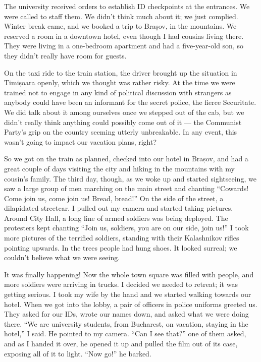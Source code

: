 \documentclass[12pt]{book}
\begin{document}
The university received orders to establish ID checkpoints at the
entrances. We were called to staff them. We didn't think much about it;
we just complied. Winter break came, and we booked a trip to Brașov, in
the mountains. We reserved a room in a downtown hotel, even though I had
cousins living there. They were living in a one-bedroom apartment and
had a five-year-old son, so they didn't really have room for guests.

On the taxi ride to the train station, the driver brought up the
situation in Timișoara openly, which we thought was rather risky. At the
time we were trained not to engage in any kind of political discussion
with strangers as anybody could have been an informant for the secret
police, the fierce Securitate. We did talk about it among ourselves once
we stepped out of the cab, but we didn't really think anything could
possibly come out of it --- the Communist Party's grip on the country
seeming utterly unbreakable. In any event, this wasn't going to impact
our vacation plans, right?

So we got on the train as planned, checked into our hotel in Brașov, and
had a great couple of days visiting the city and hiking in the mountains
with my cousin's family. The third day, though, as we woke up and
started sightseeing, we saw a large group of men marching on the main
street and chanting ``Cowards! Come join us, come join us! Bread,
bread!'' On the side of the street, a dilapidated streetcar. I pulled
out my camera and started taking pictures. Around City Hall, a long line
of armed soldiers was being deployed. The protesters kept chanting
``Join us, soldiers, you are on our side, join us!'' I took more
pictures of the terrified soldiers, standing with their Kalashnikov
rifles pointing upwards. In the trees people had hung shoes. It looked
surreal; we couldn't believe what we were seeing.

It was finally happening! Now the whole town square was filled with
people, and more soldiers were arriving in trucks. I decided we needed
to retreat; it was getting serious. I took my wife by the hand and we
started walking towards our hotel. When we got into the lobby, a pair of
officers in police uniforms greeted us. They asked for our IDs, wrote
our names down, and asked what we were doing there. ``We are university
students, from Bucharest, on vacation, staying in the hotel,'' I said.
He pointed to my camera. ``Can I see that?'' one of them asked, and as I
handed it over, he opened it up and pulled the film out of its case,
exposing all of it to light. ``Now go!'' he barked.
\end{document}
